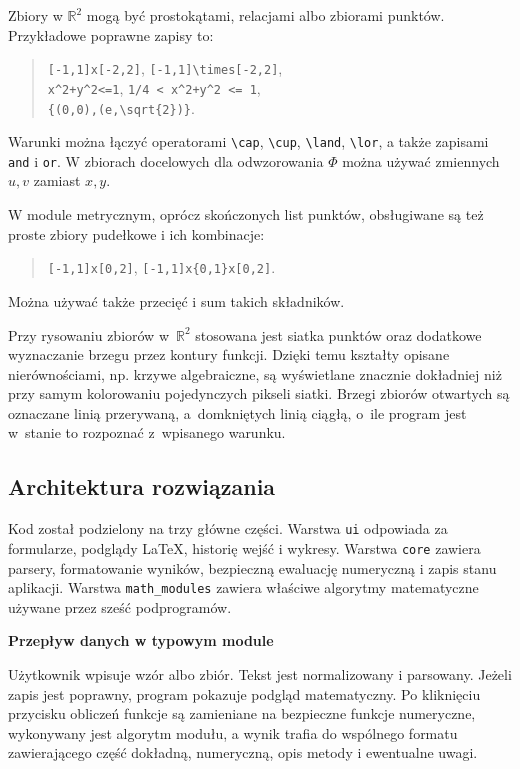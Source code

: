 \documentclass[12pt,a4paper]{article}
\newcommand{\plainnote}[2]{%
\par\medskip
\noindent\begin{minipage}{0.94\linewidth}
\textbf{#1}\par\smallskip
#2
\end{minipage}
\par\medskip
}
\newcommand{\techbox}[2]{\plainnote{#1}{#2}}
\begin{document}
Zbiory w $\mathbb{R}^2$ mogą być prostokątami, relacjami albo zbiorami punktów. Przykładowe poprawne zapisy to:
\begin{quote}
\small
\verb|[-1,1]x[-2,2]|,\quad
\verb|[-1,1]\times[-2,2]|,\\
\verb|x^2+y^2<=1|,\quad
\verb|1/4 < x^2+y^2 <= 1|,\\
\verb|{(0,0),(e,\sqrt{2})}|.
\end{quote}
Warunki można łączyć operatorami \verb|\cap|, \verb|\cup|, \verb|\land|, \verb|\lor|, a także zapisami \verb|and| i \verb|or|. W zbiorach docelowych dla odwzorowania $\Phi$ można używać zmiennych $u,v$ zamiast $x,y$.

W module metrycznym, oprócz skończonych list punktów, obsługiwane są też proste zbiory pudełkowe i ich kombinacje:
\begin{quote}
\small
\verb|[-1,1]x[0,2]|,\quad
\verb|[-1,1]x{0,1}x[0,2]|.
\end{quote}
Można używać także przecięć i sum takich składników.

Przy rysowaniu zbiorów w~$\mathbb{R}^2$ stosowana jest siatka punktów oraz dodatkowe wyznaczanie brzegu przez kontury funkcji. Dzięki temu kształty opisane nierównościami, np. krzywe algebraiczne, są wyświetlane znacznie dokładniej niż przy samym kolorowaniu pojedynczych pikseli siatki. Brzegi zbiorów otwartych są oznaczane linią przerywaną, a~domkniętych linią ciągłą, o~ile program jest w~stanie to rozpoznać z~wpisanego warunku.

\subsection{Architektura rozwiązania}

Kod został podzielony na trzy główne części. Warstwa \texttt{ui} odpowiada za formularze, podglądy LaTeX, historię wejść i wykresy. Warstwa \texttt{core} zawiera parsery, formatowanie wyników, bezpieczną ewaluację numeryczną i zapis stanu aplikacji. Warstwa \texttt{math\_modules} zawiera właściwe algorytmy matematyczne używane przez sześć podprogramów.

\techbox{Przepływ danych w typowym module}{
Użytkownik wpisuje wzór albo zbiór. Tekst jest normalizowany i parsowany. Jeżeli zapis jest poprawny, program pokazuje podgląd matematyczny. Po kliknięciu przycisku obliczeń funkcje są zamieniane na bezpieczne funkcje numeryczne, wykonywany jest algorytm modułu, a wynik trafia do wspólnego formatu zawierającego część dokładną, numeryczną, opis metody i ewentualne uwagi.
}
\end{document}
